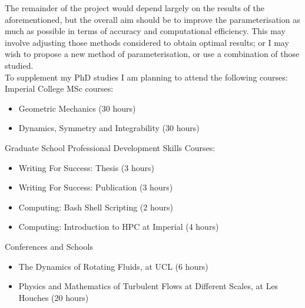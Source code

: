 \documentclass[11pt]{article}
\begin{document}
		\linebreak
		  The remainder of the project would depend largely on the results of the aforementioned, but the overall aim should be to improve the parameterisation as much as possible in terms of accuracy and computational efficiency. This may involve adjusting those methods considered to obtain optimal results; or I may wish to propose a new method of parameterisation, or use a combination of those studied. \\
		\linebreak
	\newpage
To supplement my PhD studies I am planning to attend the following courses:\\
\linebreak
Imperial College MSc courses:
\begin{itemize}
\item Geometric Mechanics (30 hours)
\item Dynamics, Symmetry and Integrability (30 hours)
\end{itemize}

Graduate School Professional Development Skills Courses:
\begin{itemize}
\item Writing For Success: Thesis (3 hours)
\item Writing For Success: Publication (3 hours)
\item Computing: Bash Shell Scripting (2 hours)
\item Computing: Introduction to HPC at Imperial (4 hours)
\end{itemize}

Conferences and Schools
\begin{itemize}
\item The Dynamics of Rotating Fluids, at UCL (6 hours)
\item Physics and Mathematics of Turbulent Flows at Different Scales, at Les Houches (20 hours)
\end{itemize}
\end{document}
